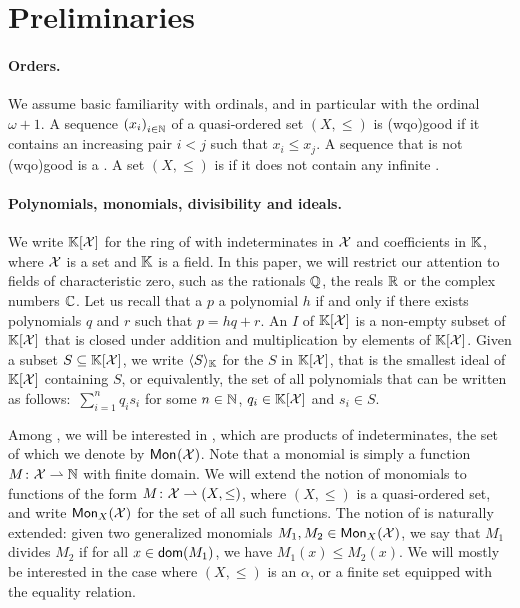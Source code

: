 \section{Preliminaries}
\label{sec:preliminaries}

\paragraph{Orders.} We assume basic familiarity with ordinals, and in
particular with the ordinal $\omega+1$. A sequence $\seqof{x_i}[i \in \N]$ of a
quasi-ordered set $(X,\leq)$ is \intro(wqo){good} if it contains an increasing
pair $i < j$ such that $x_i \leq x_j$. A sequence that is not \kl(wqo){good} is
a . A set $(X,\leq)$ is  if it
does not contain any infinite .

\paragraph{Polynomials, monomials, divisibility and
ideals.} We write $\poly{\K}{\X}$ for the ring of
 with indeterminates in $\X$ and
coefficients in $\K$, where $\X$ is a set and $\K$ is a
field. In this paper, we will restrict our attention to
fields of characteristic zero, such as the rationals
$\Q$, the reals $\R$ or the complex numbers $\C$. Let us
recall that a  $p$  a
polynomial $h$ if and only if there exists polynomials
$q$ and $r$ such that $p = h q + r$. An  $I$
of $\poly{\K}{\X}$ is a non-empty subset of
$\poly{\K}{\X}$ that is closed under addition and
multiplication by elements of $\poly{\K}{\X}$. Given a
subset $S \subseteq \poly{\K}{\X}$, we write
$\gen{S}{\K}$ for the  $S$ in
$\poly{\K}{\X}$, that is the smallest ideal of
$\poly{\K}{\X}$ containing $S$, or equivalently, the set
of all polynomials that can be written as follows:
$\,\sum_{i=1}^n q_i s_i$ for some $n \in \N$, $q_i \in
\poly{\K}{\X}$ and $s_i \in S$.

\AP Among , we will be interested in , which
are products of indeterminates, the set of which we denote by $\mon{\X}$. Note
that a monomial is simply a function $M \colon \X \topartial \N$ with finite
domain. We will extend the notion of monomials to functions of the form $M
\colon \X \topartial (X, \leq)$, where $(X, \leq)$ is a quasi-ordered set, and
write $\mon[X]{\X}$ for the set of all such functions. The notion of
 is naturally extended: given two generalized monomials $M_1,
M_2 \in \mon[X]{\X}$, we say that $M_1$ divides $M_2$ if for all $x \in
\dom(M_1)$, we have $M_1(x) \leq M_2(x)$. We will mostly be interested in the
case where $(X, \leq)$ is an  $\alpha$, or a finite set equipped
with the equality relation.

